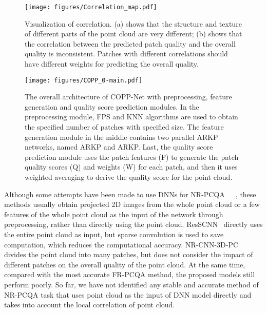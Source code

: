 \documentclass[conference]{IEEEtran}
\begin{document}
\begin{figure}[t]             \begin{center}
    \texttt{[image: figures/Correlation\_map.pdf]}
\end{center}
\vspace{-0.1cm}
   \caption{Visualization of correlation. (a) shows that the structure and texture of different parts of the point cloud are very different; (b) shows that the correlation between the predicted patch quality and the overall quality is inconsistent. Patches with different correlations should have different weights for predicting the overall quality.}
\label{fig:correlation}
\end{figure}



\begin{figure*}[t]       \begin{center}
    \texttt{[image: figures/COPP\_0-main.pdf]}
\end{center}
\vspace{-0.3cm}
   \caption{The overall architecture of COPP-Net with preprocessing, feature generation and quality score prediction modules. In the preprocessing module, FPS and KNN algorithms are used to obtain the specified number of patches with specified size. The feature generation module in the middle contains two parallel ARKP networks, named ARKP and ARKP. Last, the quality score prediction module uses the patch features (F) to generate the patch quality scores (Q) and weights (W) for each patch, and then it uses weighted averaging to derive the quality score for the point cloud.}
\label{fig:model structure}
\end{figure*}







Although some attempts have been made to use DNNs for NR-PCQA~\cite{liu2021pqa}~\cite{zhang2022no}~\cite{yang2022no}, these methods usually obtain projected 2D images from the whole point cloud or a few features of the whole point cloud as the input of the network through preprocessing, rather than directly using the point cloud. ResSCNN~\cite{liu2022point} directly uses the entire point cloud as input, but sparse convolution is used to save computation, which reduces the computational accuracy. NR-CNN-3D-PC~\cite{chetouani2021deep} divides the point cloud into many patches, but does not consider the impact of different patches on the overall quality of the point cloud. At the same time, compared with the most accurate FR-PCQA method, the proposed models still perform poorly. 
So far, we have not identified any stable and accurate method of NR-PCQA task that uses point cloud as the input of DNN model directly and takes into account the local correlation of point cloud.
\end{document}
